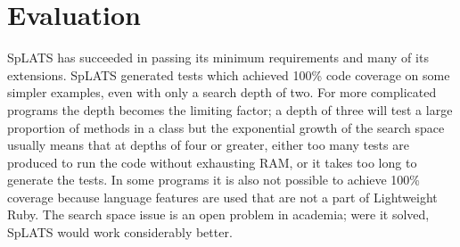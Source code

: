 \documentclass{article}
\begin{document}
\section{Evaluation}
SpLATS has succeeded in passing its minimum requirements and many of its extensions. SpLATS generated tests which achieved 100\% code coverage on some simpler examples, even with only a search depth of two. For more complicated programs the depth becomes the limiting factor; a depth of three will test a large proportion of methods in a class but the exponential growth of the search space usually means that at depths of four or greater, either too many tests are produced to run the code without exhausting RAM, or it takes too long to generate the tests. In some programs it is also not possible to achieve 100\% coverage because language features are used that are not a part of Lightweight Ruby. The search space issue is an open problem in academia; were it solved, SpLATS would work considerably better.
\end{document}
